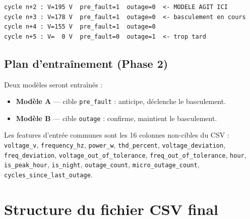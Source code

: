 \documentclass[12pt,a4paper]{article}
\begin{document}
\begin{lstlisting}
cycle n+2 : V=195 V  pre_fault=1  outage=0  <- MODELE AGIT ICI
cycle n+3 : V=178 V  pre_fault=1  outage=0  <- basculement en cours
cycle n+4 : V=155 V  pre_fault=1  outage=0
cycle n+5 : V=  0 V  pre_fault=0  outage=1  <- trop tard
\end{lstlisting}

\subsection{Plan d'entraînement (Phase 2)}

Deux modèles seront entraînés :

\begin{itemize}
  \item \textbf{Modèle A} — cible \texttt{pre\_fault} : anticipe, déclenche le basculement.
  \item \textbf{Modèle B} — cible \texttt{outage} : confirme, maintient le basculement.
\end{itemize}

Les features d'entrée communes sont les 16 colonnes non-cibles du CSV :
\texttt{voltage\_v}, \texttt{frequency\_hz}, \texttt{power\_w}, \texttt{thd\_percent},
\texttt{voltage\_deviation}, \texttt{freq\_deviation},
\texttt{voltage\_out\_of\_tolerance}, \texttt{freq\_out\_of\_tolerance},
\texttt{hour}, \texttt{is\_peak\_hour}, \texttt{is\_night},
\texttt{outage\_count}, \texttt{micro\_outage\_count},
\texttt{cycles\_since\_last\_outage}.

\section{Structure du fichier CSV final}
\end{document}
